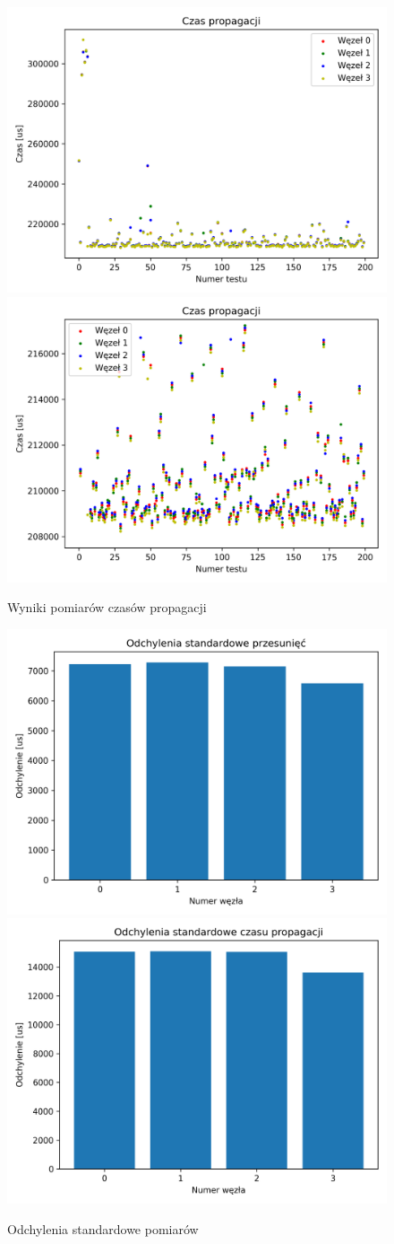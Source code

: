 \begin{figure}[h]
\centering
    \includegraphics[width=.49\textwidth]{pics/ntp_sync/prop_times.png}
    \includegraphics[width=.49\textwidth]{pics/ntp_sync/prop_times_close.png}
\caption{Wyniki pomiarów czasów propagacji}
\label{pic:prop_times}
\end{figure}

\begin{figure}[h]
\centering
    \includegraphics[width=.49\textwidth]{pics/ntp_sync/stddev_offsets.png}
    \includegraphics[width=.49\textwidth]{pics/ntp_sync/stddev_prop.png}
\caption{Odchylenia standardowe pomiarów}
\label{pic:stddev_ntp}
\end{figure}


